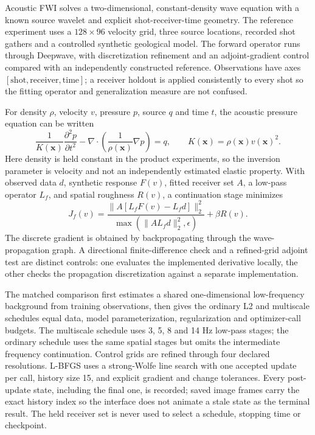 Acoustic FWI solves a two-dimensional, constant-density wave equation
with a known source wavelet and explicit shot-receiver-time geometry.
The reference experiment uses a \(128\times96\) velocity grid, three
source locations, recorded shot gathers and a controlled synthetic
geological model. The forward operator runs through Deepwave, with
discretization refinement and an adjoint-gradient control compared with
an independently constructed reference. Observations have axes
\([\mathrm{shot},\mathrm{receiver},\mathrm{time}]\); a receiver holdout
is applied consistently to every shot so the fitting operator and
generalization measure are not confused.

For density \(\rho\), velocity \(v\), pressure \(p\), source \(q\) and
time \(t\), the acoustic pressure equation can be written
\begin{equation}\label{eq:fwi-wave}
 \frac{1}{K(\mathbf{x})}\frac{\partial^2p}{\partial t^2}
 -\nabla\cdot\left(\frac{1}{\rho(\mathbf{x})}\nabla p\right)=q,
 \qquad K(\mathbf{x})=\rho(\mathbf{x})v(\mathbf{x})^2.
\end{equation}
Here density is held constant in the product experiments, so the
inversion parameter is velocity and not an independently estimated
elastic property. With observed data \(d\), synthetic response
\(F(v)\), fitted receiver set \(A\), a low-pass operator \(L_f\), and
spatial roughness \(R(v)\), a continuation stage minimizes
\begin{equation}\label{eq:fwi-objective}
 J_f(v)=
 \frac{\|A[L_fF(v)-L_fd]\|_2^2}
 {\max(\|A L_fd\|_2^2,\epsilon)}
 +\beta R(v).
\end{equation}
The discrete gradient is obtained by backpropagating through the
wave-propagation graph. A directional finite-difference check and a
refined-grid adjoint test are distinct controls: one evaluates the
implemented derivative locally, the other checks the propagation
discretization against a separate implementation.

The matched comparison first estimates a shared one-dimensional
low-frequency background from training observations, then gives the
ordinary L2 and multiscale schedules equal data, model parameterization,
regularization and optimizer-call budgets. The multiscale schedule uses
3, 5, 8 and 14 Hz low-pass stages; the ordinary schedule uses the same
spatial stages but omits the intermediate frequency continuation.
Control grids are refined through four declared resolutions. L-BFGS
uses a strong-Wolfe line search with one accepted update per call,
history size 15, and explicit gradient and change tolerances. Every
post-update state, including the final one, is recorded; saved image
frames carry the exact history index so the interface does not animate a
stale state as the terminal result. The held receiver set is never used
to select a schedule, stopping time or checkpoint.

